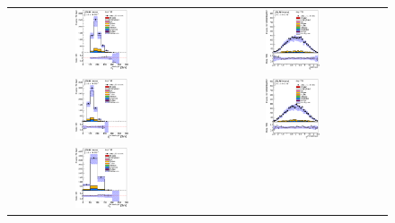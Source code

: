 \clearpage
\begin{figure}[htbp]
\begin{center}
\begin{tabular}{cc}
%
\includegraphics[width=0.30\textwidth]{appendices/figures/sdrs/JetPt1_ELEMUONCR0_1W_NOMINAL.eps} &
\includegraphics[width=0.30\textwidth]{appendices/figures/sdrs/JetEta1_ELEMUONCR0_1W_NOMINAL.eps} \\
\includegraphics[width=0.30\textwidth]{appendices/figures/sdrs/JetPt2_ELEMUONCR0_1W_NOMINAL.eps} &
\includegraphics[width=0.30\textwidth]{appendices/figures/sdrs/JetEta2_ELEMUONCR0_1W_NOMINAL.eps} \\
\includegraphics[width=0.30\textwidth]{appendices/figures/sdrs/JetPt3_ELEMUONCR0_1W_NOMINAL.eps} &

\end{tabular}
\end{center}
\end{figure}
